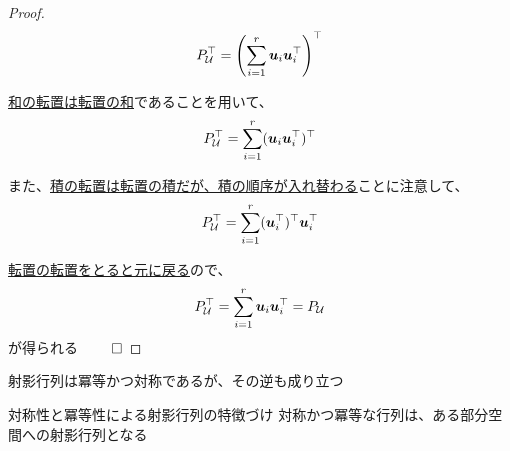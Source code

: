 \documentclass[../../../topic_linear-algebra]{subfiles}
\begin{document}
\begin{proof}
  \begin{equation*}
    P_{\mathcal{U}}^\top = \left( \sum_{i=1}^{r} \vb*{u}_i\vb*{u}_i^\top \right)^\top
  \end{equation*}

  \hyperref[thm:transpose-distributes-over-sum]{和の転置は転置の和}であることを用いて、
  \begin{equation*}
    P_{\mathcal{U}}^\top = \sum_{i=1}^{r} (\vb*{u}_i\vb*{u}_i^\top)^\top
  \end{equation*}

  また、\hyperref[thm:transpose-of-product]{積の転置は転置の積だが、積の順序が入れ替わる}ことに注意して、
  \begin{equation*}
    P_{\mathcal{U}}^\top = \sum_{i=1}^{r} (\vb*{u}_i^\top)^\top \vb*{u}_i^\top
  \end{equation*}

  \hyperref[thm:transpose-involution]{転置の転置をとると元に戻る}ので、
  \begin{equation*}
    P_{\mathcal{U}}^\top = \sum_{i=1}^{r} \vb*{u}_i \vb*{u}_i^\top = P_{\mathcal{U}}
  \end{equation*}
  が得られる $\qed$
\end{proof}

\sectionline

射影行列は冪等かつ対称であるが、その逆も成り立つ

\begin{theorem}{対称性と冪等性による射影行列の特徴づけ}
  対称かつ冪等な行列は、ある部分空間への射影行列となる
\end{theorem}
\end{document}
